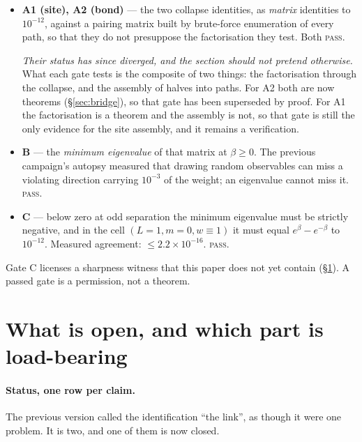 \documentclass[11pt]{article}
\theoremstyle{definition}
\begin{document}
\begin{itemize}
\item \textbf{A1 (site), A2 (bond)} --- the two collapse identities, as
  \emph{matrix} identities to $10^{-12}$, against a pairing matrix built by
  brute-force enumeration of every path, so that they do not presuppose the
  factorisation they test.  Both \textsc{pass}.

  \emph{Their status has since diverged, and the section should not pretend
  otherwise.}  What each gate tests is the composite of two things: the
  factorisation through the collapse, and the assembly of halves into paths.
  For A2 both are now theorems (\S\ref{sec:bridge}), so that gate has been
  superseded by proof.  For A1 the factorisation is a theorem and the assembly
  is not, so that gate is still the only evidence for the site assembly, and it
  remains a verification.
\item \textbf{B} --- the \emph{minimum eigenvalue} of that matrix at
  $\beta\ge0$.  The previous campaign's autopsy measured that drawing random
  observables can miss a violating direction carrying $10^{-3}$ of the weight;
  an eigenvalue cannot miss it.  \textsc{pass}.
\item \textbf{C} --- below zero at odd separation the minimum eigenvalue must be
  strictly negative, and in the cell $(L=1,m=0,w\equiv1)$ it must equal
  $e^{\beta}-e^{-\beta}$ to $10^{-12}$.  Measured agreement: $\le2.2\times
  10^{-16}$.  \textsc{pass}.
\end{itemize}

Gate C licenses a sharpness witness that this paper does not yet contain
(\S\ref{sec:open}).  A passed gate is a permission, not a theorem.

\section{What is open, and which part is load-bearing}\label{sec:open}

\paragraph{Status, one row per claim.}  The previous version called the
identification ``the link'', as though it were one problem.  It is two, and one
of them is now closed.
\end{document}
